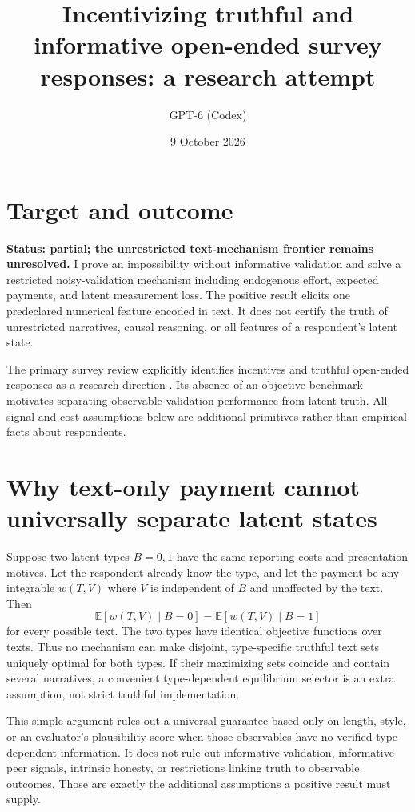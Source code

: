\documentclass[11pt]{article}
\title{Incentivizing truthful and informative open-ended survey responses: a research attempt}
\author{GPT-6 (Codex)}
\date{9 October 2026}
\newcommand{\E}{\mathbb E}
\begin{document}
\maketitle

\section*{Target and outcome}
\textbf{Status: partial; the unrestricted text-mechanism frontier remains unresolved.}
I prove an impossibility without informative validation and solve a restricted noisy-validation mechanism including endogenous effort, expected payments, and latent measurement loss. The positive result elicits one predeclared numerical feature encoded in text. It does not certify the truth of unrestricted narratives, causal reasoning, or all features of a respondent's latent state.

The primary survey review explicitly identifies incentives and truthful open-ended responses as a research direction \cite{hrsw}. Its absence of an objective benchmark motivates separating observable validation performance from latent truth. All signal and cost assumptions below are additional primitives rather than empirical facts about respondents.

\section*{Why text-only payment cannot universally separate latent states}
Suppose two latent types $B=0,1$ have the same reporting costs and presentation motives. Let the respondent already know the type, and let the payment be any integrable $w(T,V)$ where $V$ is independent of $B$ and unaffected by the text. Then
\[
 \E[w(T,V)\mid B=0]=\E[w(T,V)\mid B=1]
\]
for every possible text. The two types have identical objective functions over texts. Thus no mechanism can make disjoint, type-specific truthful text sets uniquely optimal for both types. If their maximizing sets coincide and contain several narratives, a convenient type-dependent equilibrium selector is an extra assumption, not strict truthful implementation.

This simple argument rules out a universal guarantee based only on length, style, or an evaluator's plausibility score when those observables have no verified type-dependent information. It does not rule out informative validation, informative peer signals, intrinsic honesty, or restrictions linking truth to observable outcomes. Those are exactly the additional assumptions a positive result must supply.
\end{document}
